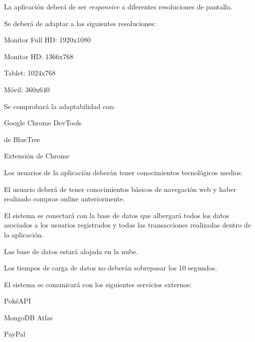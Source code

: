 \begin{RNF}
	\item La aplicación deberá de ser \textit{responsive} a diferentes resoluciones de pantalla.
	\begin{RNF}
		\item Se deberá de adaptar a las siguientes resoluciones:
		\begin{RNF}
			\item Monitor Full HD: 1920x1080
			\item Monitor HD: 1366x768
			\item Tablet: 1024x768
			\item Móvil: 360x640
		\end{RNF}
		\item Se comprobará la adaptabilidad con:
		\begin{RNF}
			\item Google Chrome DevTools
			\item {} de BlueTree
			\item Extensión de Chrome 
		\end{RNF}
	\end{RNF}
	

	\item Los usuarios de la aplicación deberán tener conocimientos tecnológicos medios.
	\begin{RNF}
		\item El usuario deberá de tener conocimientos básicos de navegación web y haber realizado compras online anteriormente.
	\end{RNF}
	
	\item El sistema se conectará con la base de datos que albergará todos los datos asociados a los usuarios registrados y todas las transacciones realizadas dentro de la aplicación.
	\begin{RNF}
		\item Las base de datos estará alojada en la nube.
		\item Los tiempos de carga de datos no deberán sobrepasar los 10 segundos.
	\end{RNF}

	\item El sistema se comunicará con los siguientes servicios externos:
	\begin{RNF}
		\item PokéAPI
		\item MongoDB Atlas
		\item PayPal
	\end{RNF}
\end{RNF}